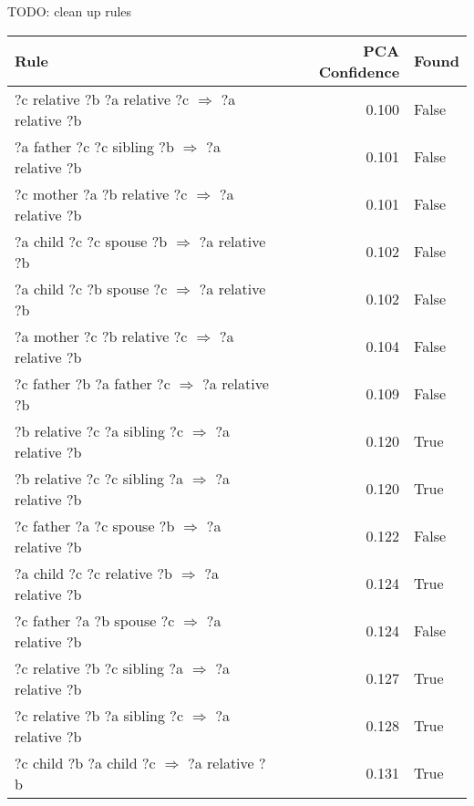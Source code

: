 TODO: clean up rules

\begin{longtable}{lrl}
\toprule
                                                    Rule &  PCA Confidence &  Found \\
\midrule
?c  relative  ?b  ?a  relative  ?c   $\Rightarrow$ ?a  relative  ?b &           0.100 &                    False \\
   ?a  father  ?c  ?c  sibling  ?b   $\Rightarrow$ ?a  relative  ?b &           0.101 &                    False \\
  ?c  mother  ?a  ?b  relative  ?c   $\Rightarrow$ ?a  relative  ?b &           0.101 &                    False \\
     ?a  child  ?c  ?c  spouse  ?b   $\Rightarrow$ ?a  relative  ?b &           0.102 &                    False \\
     ?a  child  ?c  ?b  spouse  ?c   $\Rightarrow$ ?a  relative  ?b &           0.102 &                    False \\
  ?a  mother  ?c  ?b  relative  ?c   $\Rightarrow$ ?a  relative  ?b &           0.104 &                    False \\
    ?c  father  ?b  ?a  father  ?c   $\Rightarrow$ ?a  relative  ?b &           0.109 &                    False \\
 ?b  relative  ?c  ?a  sibling  ?c   $\Rightarrow$ ?a  relative  ?b &           0.120 &                     True \\
 ?b  relative  ?c  ?c  sibling  ?a   $\Rightarrow$ ?a  relative  ?b &           0.120 &                     True \\
    ?c  father  ?a  ?c  spouse  ?b   $\Rightarrow$ ?a  relative  ?b &           0.122 &                    False \\
   ?a  child  ?c  ?c  relative  ?b   $\Rightarrow$ ?a  relative  ?b &           0.124 &                     True \\
    ?c  father  ?a  ?b  spouse  ?c   $\Rightarrow$ ?a  relative  ?b &           0.124 &                    False \\
 ?c  relative  ?b  ?c  sibling  ?a   $\Rightarrow$ ?a  relative  ?b &           0.127 &                     True \\
 ?c  relative  ?b  ?a  sibling  ?c   $\Rightarrow$ ?a  relative  ?b &           0.128 &                     True \\
      ?c  child  ?b  ?a  child  ?c   $\Rightarrow$ ?a  relative  ?b &           0.131 &                     True \\

\end{longtable}
